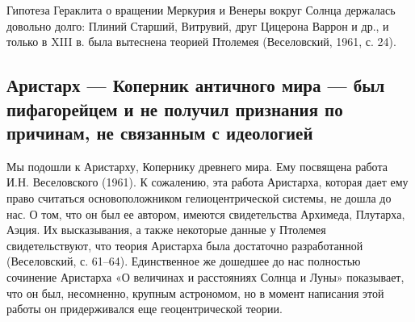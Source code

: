 Гипотеза  Гераклита  о  вращении   Меркурия  и  Венеры  вокруг  Солнца
держалась  довольно долго:  Плиний  Старший,  Витрувий, друг  Цицерона
Варрон  и др.,  и только  в XIII  в. была  вытеснена теорией  Птолемея
(Веселовский, 1961, с. 24).

\subsection{Аристарх --- Коперник античного  мира --- был пифагорейцем
и не получил признания по причинам, не связанным с идеологией}

Мы подошли к Аристарху, Копернику  древнего мира. Ему посвящена работа
И.Н. Веселовского  (1961). К сожалению, эта  работа Аристарха, которая
дает ему  право считаться основоположником  гелиоцентрической системы,
не дошла до  нас. О том, что он был  ее автором, имеются свидетельства
Архимеда, Плутарха,  Аэция. Их высказывания, а  также некоторые данные
у  Птолемея  свидетельствуют,  что теория  Аристарха  была  достаточно
разработанной (Веселовский,  с. 61--64).  Единственное же  дошедшее до
нас полностью сочинение Аристарха «О  величинах и расстояниях Солнца и
Луны» показывает,  что он  был, несомненно,  крупным астрономом,  но в
момент  написания этой  работы  он  придерживался еще  геоцентрической
теории.

